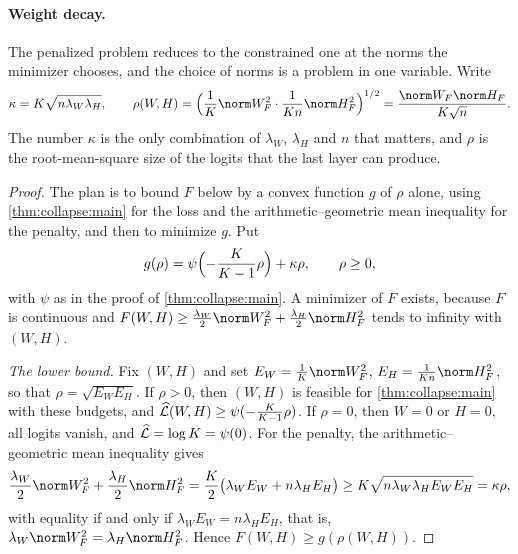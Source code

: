 \begin{refsection}
\paragraph{Weight decay.} The penalized problem reduces to the constrained one at the norms the minimizer chooses, and the choice of norms is a problem in one variable. Write
\[
  \kappa=K\sqrt{n\lambda_W\lambda_H},\qquad\rho(W,H)=\Bigl(\frac1K\norm W_F^2\cdot\frac1{Kn}\norm H_F^2\Bigr)^{1/2}=\frac{\norm W_F\norm H_F}{K\sqrt n}.
\]
The number $\kappa$ is the only combination of $\lambda_W$, $\lambda_H$ and $n$ that matters, and $\rho$ is the root-mean-square size of the logits that the last layer can produce.


\begin{proof}
The plan is to bound $F$ below by a convex function $g$ of $\rho$ alone, using \cref{thm:collapse:main} for the loss and the arithmetic--geometric mean inequality for the penalty, and then to minimize $g$. Put
\[
  g(\rho)=\psi\Bigl(-\frac K{K-1}\rho\Bigr)+\kappa\rho,\qquad\rho\ge0,
\]
with $\psi$ as in the proof of \cref{thm:collapse:main}. A minimizer of $F$ exists, because $F$ is continuous and $F(W,H)\ge\frac{\lambda_W}2\norm W_F^2+\frac{\lambda_H}2\norm H_F^2$ tends to infinity with $(W,H)$.

\emph{The lower bound.} Fix $(W,H)$ and set $E_W=\frac1K\norm W_F^2$, $E_H=\frac1{Kn}\norm H_F^2$, so that $\rho=\sqrt{E_WE_H}$. If $\rho>0$, then $(W,H)$ is feasible for \cref{thm:collapse:main} with these budgets, and $\widehat{\mathcal{L}}(W,H)\ge\psi(-\frac K{K-1}\rho)$. If $\rho=0$, then $W=0$ or $H=0$, all logits vanish, and $\widehat{\mathcal{L}}=\log K=\psi(0)$. For the penalty, the arithmetic--geometric mean inequality gives
\[
  \frac{\lambda_W}2\norm W_F^2+\frac{\lambda_H}2\norm H_F^2=\frac K2\bigl(\lambda_WE_W+n\lambda_HE_H\bigr)\ge K\sqrt{n\lambda_W\lambda_HE_WE_H}=\kappa\rho ,
\]
with equality if and only if $\lambda_WE_W=n\lambda_HE_H$, that is, $\lambda_W\norm W_F^2=\lambda_H\norm H_F^2$. Hence $F(W,H)\ge g(\rho(W,H))$.


\end{proof}
\end{refsection}
